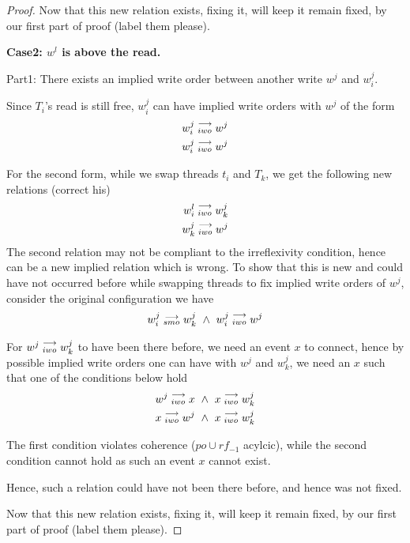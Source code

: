 \begin{proof}
                    Now that this new relation exists, fixing it, will keep it remain fixed, by our first part of proof (label them please). 
                    
            
            \textbf{Case2: $w^l$ is above the read.}
                
                Part1: There exists an implied write order between another write $w^j$ and $w_i^j$.

                Since $T_i$'s read is still free, $w_i^j$ can have implied write orders with $w^j$ of the form
                \begin{align}
                    w_i^j\stackrel{\longrightarrow}{_{iwo}}w^j \\
                    w_i^j\stackrel{\longrightarrow}{_{iwo}}w^j 
                \end{align}


                For the second form, while we swap threads $t_i$ and $T_k$, we get the following new relations (correct his)
                \begin{align}
                    w_i^l\stackrel{\longrightarrow}{_{iwo}}w_k^j \\
                    w_k^j\stackrel{\longrightarrow}{_{iwo}}w^j
                \end{align}
                The second relation may not be compliant to the irreflexivity condition, hence can be a new implied relation which is wrong. To show that this is new and could have not occurred before while swapping threads to fix implied write orders of $w^j$, consider the original configuration we have 
                \begin{align}
                    \reln{w_i^j}{smo}{w_k^j} \ \wedge \ \reln{w_i^j}{iwo}{w^j}
                \end{align}

                For $w^j\stackrel{\longrightarrow}{_{iwo}}w_k^j$ to have been there before, we need an event $x$ to connect, hence by possible implied write orders one can have with $w^j$ and $w_k^j$, we need an $x$ such that one of the conditions below hold
                \begin{align}
                    w^j\stackrel{\longrightarrow}{_{iwo}}x \ \wedge \ x\stackrel{\longrightarrow}{_{iwo}}w_k^j \\ 
                    x\stackrel{\longrightarrow}{_{iwo}}w^j \ \wedge \ x\stackrel{\longrightarrow}{_{iwo}}w_k^j
                \end{align}

                The first condition violates coherence ($po \cup rf_{-1}$ acylcic), while the second condition cannot hold as such an event $x$ cannot exist. 
                
                Hence, such a relation could have not been there before, and hence was not fixed. 

                Now that this new relation exists, fixing it, will keep it remain fixed, by our first part of proof (label them please).


        \end{proof}

        

   